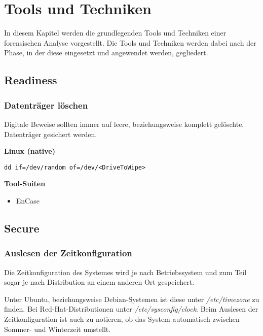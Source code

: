 \chapter{Tools und Techniken} \label{chap:ToolsTechniques}
In diesem Kapitel werden die grundlegenden Tools und Techniken einer forensischen Analyse vorgestellt. Die Tools und Techniken werden dabei nach der Phase, in der diese eingesetzt und angewendet werden, gegliedert.



\section{Readiness}

\subsection{Datenträger löschen}
Digitale Beweise sollten immer auf leere, beziehungsweise komplett gelöschte, Datenträger gesichert werden.

\textbf{Linux (native)} \\
\begin{verbatim}
dd if=/dev/random of=/dev/<DriveToWipe>
\end{verbatim}

\textbf{Tool-Suiten}\\
\begin{itemize}
\item EnCase
\end{itemize}




\section{Secure}

\subsection{Auslesen der Zeitkonfiguration}
Die Zeitkonfiguration des Systemes wird je nach Betriebssystem und zum Teil sogar je nach Distribution an einem anderen Ort gespeichert.

Unter Ubuntu, beziehungsweise Debian-Systemen ist diese unter \textit{/etc/timezone} zu finden. Bei Red-Hat-Distributionen unter \textit{/etc/sysconfig/clock}.
Beim Auslesen der Zeitkonfiguration ist auch zu notieren, ob das System automatisch zwischen Sommer- und Winterzeit umstellt.

